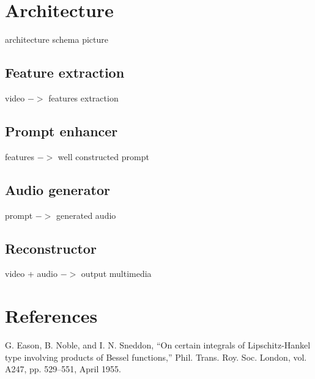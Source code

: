 \documentclass[conference]{IEEEtran}
\begin{document}
\section{Architecture}
architecture schema picture


\subsection{Feature extraction}
video $->$ features extraction
\subsection{Prompt enhancer}
features $->$ well constructed prompt
\subsection{Audio generator}
prompt $->$ generated audio
\subsection{Reconstructor}
video + audio $->$ output multimedia


\section*{References}


\begin{thebibliography}{00}
 G. Eason, B. Noble, and I. N. Sneddon, ``On certain integrals of Lipschitz-Hankel type involving products of Bessel functions,'' Phil. Trans. Roy. Soc. London, vol. A247, pp. 529--551, April 1955.
\end{thebibliography}
\end{document}

